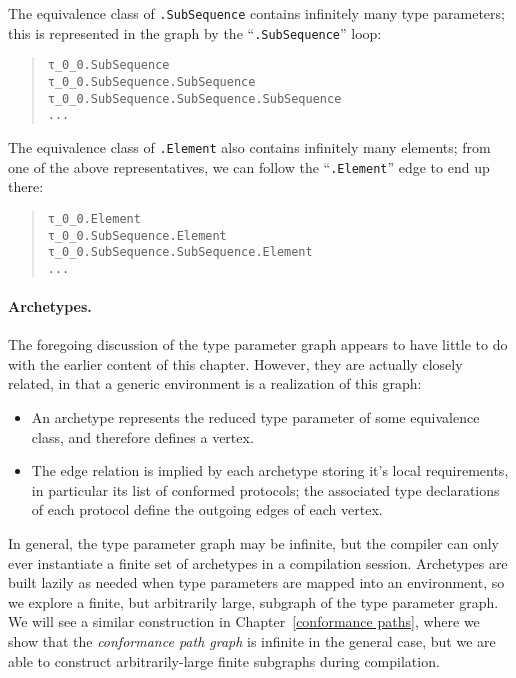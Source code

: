 \documentclass[../generics]{subfiles}
\begin{document}
\begin{example}
\begin{quote}
\begin{tikzpicture}
\end{tikzpicture}
\end{quote}
The equivalence class of \texttt{.SubSequence} contains infinitely many type parameters; this is represented in the graph by the ``\texttt{.SubSequence}'' loop:
\begin{quote}
\begin{verbatim}
τ_0_0.SubSequence
τ_0_0.SubSequence.SubSequence
τ_0_0.SubSequence.SubSequence.SubSequence
...
\end{verbatim}
\end{quote}
The equivalence class of \texttt{.Element} also contains infinitely many elements; from one of the above representatives, we can follow the ``\texttt{.Element}'' edge to end up there:
\begin{quote}
\begin{verbatim}
τ_0_0.Element
τ_0_0.SubSequence.Element
τ_0_0.SubSequence.SubSequence.Element
...
\end{verbatim}
\end{quote}
\end{example}

\paragraph{Archetypes.} The foregoing discussion of the type parameter graph appears to have little to do with the earlier content of this chapter. However, they are actually closely related, in that a generic environment is a realization of this graph:
\begin{itemize}
\item An archetype represents the reduced type parameter of some equivalence class, and therefore defines a vertex.
\item The edge relation is implied by each archetype storing it's local requirements, in particular its list of conformed protocols; the associated type declarations of each protocol define the outgoing edges of each vertex.
\end{itemize}
In general, the type parameter graph may be infinite, but the compiler can only ever instantiate a finite set of archetypes in a compilation session. Archetypes are built lazily as needed when type parameters are mapped into an environment, so we explore a finite, but arbitrarily large, subgraph of the type parameter graph. We will see a similar construction in Chapter~\ref{conformance paths}, where we show that the \emph{conformance path graph} is infinite in the general case, but we are able to construct arbitrarily-large finite subgraphs during compilation.
\end{document}
